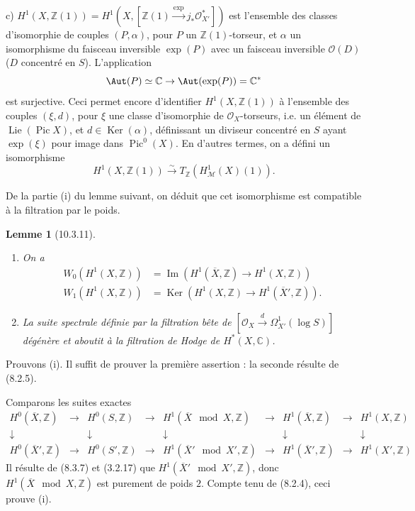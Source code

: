 \documentclass[12pt,a4paper]{amsart}
\theoremstyle{plain}
\newtheorem{lemme}{Lemme}[section]
\theoremstyle{definition}
\theoremstyle{remark}
\DeclareMathOperator{\Ker}{Ker}
\DeclareMathOperator{\Ime}{Im}
\DeclareMathOperator{\Pic}{Pic}
\DeclareMathOperator{\Lie}{Lie}
\numberwithin{equation}{section}
\begin{document}
c) $H^1(X,\mathbb{Z}(1))=H^1(X,[\mathbb{Z}(1)\xrightarrow{\exp}j_*\mathcal{O}_{X'}^*])$ est l'ensemble des classes d'isomorphie de couples $(P,\alpha)$, pour $P$ un $\mathbb{Z}(1)$-torseur, et $\alpha$ un isomorphisme du faisceau inversible $\exp(P)$ avec un faisceau inversible $\mathcal{O}(D)$ ($D$ concentré en $S$). L'application
\[
\Aut(P)\simeq\mathbb{C}\to\Aut(\exp(P))=\mathbb{C}^*
\]
est surjective. Ceci permet encore d'identifier $H^1(X,\mathbb{Z}(1))$ à l'ensemble des couples $(\xi,d)$, pour $\xi$ une classe d'isomorphie de $\mathcal{O}_X$-torseurs, i.e. un élément de $\Lie(\Pic X)$, et $d\in\Ker(\alpha)$, définissant un diviseur concentré en $S$ ayant $\exp(\xi)$ pour image dans $\Pic^0(X)$. En d'autres termes, on a défini un isomorphisme
\begin{equation}\label{eq:10.3.10.2}
H^1(X,\mathbb{Z}(1))\xrightarrow{\sim}T_\mathbb{Z}(H_\mathscr{M}^1(X)(1)).
\end{equation}

De la partie (i) du lemme suivant, on déduit que cet isomorphisme est compatible à la filtration par le poids.

\begin{lemme}[10.3.11]\label{lemme:10.3.11}
\begin{enumerate}
\item[(i)] On a
\begin{align*}
W_0(H^1(X,\mathbb{Z})) &= \Ime(H^1(\overline{X},\mathbb{Z})\to H^1(X,\mathbb{Z})) \\
W_1(H^1(X,\mathbb{Z})) &= \Ker(H^1(X,\mathbb{Z})\to H^1(\overline{X}',\mathbb{Z})).
\end{align*}

\item[(ii)] La suite spectrale définie par la filtration bête de $[\mathcal{O}_X\xrightarrow{d}\Omega_{X'}^1(\log S)]$ dégénère et aboutit à la filtration de Hodge de $H^*(X,\mathbb{C})$.
\end{enumerate}
\end{lemme}

Prouvons (i). Il suffit de prouver la première assertion : la seconde résulte de (8.2.5).

Comparons les suites exactes
\[
\begin{array}{ccccccccc}
H^0(\overline{X},\mathbb{Z}) & \longrightarrow & H^0(S,\mathbb{Z}) & \longrightarrow & H^1(\overline{X}\mod X,\mathbb{Z}) & \longrightarrow & H^1(\overline{X},\mathbb{Z}) & \longrightarrow & H^1(X,\mathbb{Z}) \\
\downarrow & & \downarrow & & \downarrow & & \downarrow & & \downarrow \\
H^0(\overline{X}',\mathbb{Z}) & \longrightarrow & H^0(S',\mathbb{Z}) & \longrightarrow & H^1(\overline{X}'\mod X',\mathbb{Z}) & \longrightarrow & H^1(\overline{X}',\mathbb{Z}) & \longrightarrow & H^1(X',\mathbb{Z})
\end{array}
\]
Il résulte de (8.3.7) et (3.2.17) que $H^1(\overline{X}'\mod X',\mathbb{Z})$, donc $H^1(\overline{X}\mod X,\mathbb{Z})$ est purement de poids $2$. Compte tenu de (8.2.4), ceci prouve (i).
\end{document}
